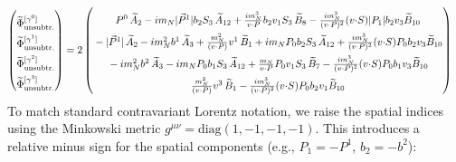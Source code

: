 \begin{align}
    \begin{pmatrix}
        \rule{0pt}{16pt} \widetilde \Phi^{[\gamma^{0}]}_{\unsub}\\
        \rule{0pt}{16pt} \widetilde \Phi^{[\gamma^{1}]}_{\unsub}\\
        \rule{0pt}{16pt} \widetilde \Phi^{[\gamma^{2}]}_{\unsub}\\
        \rule{0pt}{16pt} \widetilde \Phi^{[\gamma^{3}]}_{\unsub}
    \end{pmatrix} &=2\begin{pmatrix}
       \rule{0pt}{16pt}  P^0\, \tAmp_2  - i \mN  |\vec{P}^1| \bvec_2 S_3\, \tAmp_{12}+ \frac{ i \mN^3}{v \tcdot P}  \bvec_2 v_1 S_3\, \tBmp_8- \frac{i \mN^3}{(v \tcdot P)^2} (v \tcdot S)  |P_1| \bvec_2 v_3 \tBmp_{10}\\
        \rule{0pt}{16pt} -|\vec{P}^1|\, \tAmp_2- i \mN^2 \bvec^1\, \tAmp_3+ \frac{\mN^2}{(v \tcdot P)} v^1\, \tBmp_1 
		+ i \mN  P_0 \bvec_2 S_3\, \tAmp_{12}+ \frac{i \mN^3}{(v \tcdot P)^2} (v \tcdot S)  P_0 \bvec_2 v_3 \tBmp_{10}\\
         \rule{0pt}{16pt} - i \mN^2 \bvec^2\, \tAmp_3
		- i \mN  P_0 \bvec_1 S_3\, \tAmp_{12}+ \frac{\mN}{v \tcdot P}  P_0 v_1 S_3\, \tBmp_7- \frac{i \mN^3}{(v \tcdot P)^2} (v \tcdot S) P_0 \bvec_1 v_3 \tBmp_{10}\\
        \rule{0pt}{16pt} \frac{\mN^2}{(v \tcdot P)} v^3\, \tBmp_1- \frac{i \mN^3}{(v \tcdot P)^2} (v \tcdot S)  P_0 \bvec_2 v_1 \tBmp_{10}
    \end{pmatrix}
\end{align}
\endgroup
To match standard contravariant Lorentz notation, we raise the spatial indices using the Minkowski metric $g^{\mu\nu} = \text{diag}(1, -1, -1, -1)$. This introduces a relative minus sign for the spatial components (e.g., $P_1 = -P^1$, $b_2 = -b^2$):
\begingroup\small
